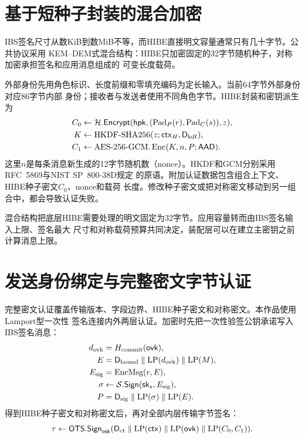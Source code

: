 \section{基于短种子封装的混合加密}

IBS签名尺寸从数KiB到数MiB不等，而HIBE直接明文容量通常只有几十字节。公共协议采用
KEM--DEM式混合结构：HIBE只加密固定的32字节随机种子，对称加密承担签名和应用消息组成的
可变长度载荷。

外部身份先用角色标识、长度前缀和零填充编码为定长输入。当前64字节外部身份对应86字节内部
身份；接收者与发送者使用不同角色字节。HIBE封装和密钥派生为
\begin{align*}
 C_0&\leftarrow\mathcal H.\mathsf{Encrypt}
       (\mathsf{hpk},(\operatorname{Pad}_P(r),\operatorname{Pad}_C(s)),z),\\
 K&\leftarrow\operatorname{HKDF\text{-}SHA256}(z;\mathsf{ctx}_H,\mathsf D_{\rm kdf}),\\
 C_1&\leftarrow\operatorname{AES\text{-}256\text{-}GCM.Enc}(K,n,P;\mathsf{AAD}).
\end{align*}
这里$n$是每条消息新生成的12字节随机数（nonce）。HKDF和GCM分别采用RFC~5869与NIST SP~800-38D规定
的原语\cite{rfc5869,nist2007gcm}。附加认证数据包含组合上下文、HIBE种子密文$C_0$、nonce和载荷
长度。修改种子密文或把对称密文移动到另一组合中，都会导致认证失败。

混合结构把底层HIBE需要处理的明文固定为32字节。应用容量转而由IBS签名输入上限、签名最大
尺寸和对称载荷预算共同决定，装配层可以在建立主密钥之前计算消息上限。

\section{发送身份绑定与完整密文字节认证}

完整密文认证覆盖传输版本、字段边界、HIBE种子密文和对称密文。本作品使用Lamport型一次性
签名连接内外两层认证\cite{lamport1979ots}。加密时先把一次性验签公钥承诺写入IBS签名消息：
\begin{align*}
 d_{\rm ovk}&=H_{\rm commit}(\mathsf{ovk}),\\
 E&=\mathsf D_{\rm bound}\parallel\mathrm{LP}(d_{\rm ovk})
       \parallel\mathrm{LP}(M),\\
 E_{\rm sig}&=\operatorname{EncMsg}(r,E),\\
 \sigma&\leftarrow\mathcal S.\mathsf{Sign}
       (\mathsf{sk}_s,E_{\rm sig}),\\
 P&=\mathsf D_{\rm sig}\parallel\mathrm{LP}(\sigma)\parallel\mathrm{LP}(E).
\end{align*}
得到HIBE种子密文和对称密文后，再对全部内层传输字节签名：
\[
 \tau\leftarrow\mathsf{OTS.Sign}_{\mathsf{osk}}
    (\mathsf D_{\rm ct}\parallel\mathrm{LP}(\mathsf{ctx})
      \parallel\mathrm{LP}(\mathsf{ovk})\parallel\mathrm{LP}(C_0,C_1)).
\]

